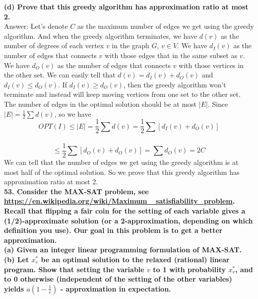 \documentclass{article}
\begin{document}
\textbf{(d) Prove that this greedy algorithm has approximation ratio at most 2.} \\ \newline
Answer: Let's denote $C$ as the maximum number of edges we get using the greedy algorithm. And when the greedy algorithm terminates, we have $d(v)$ as the number of degrees of each vertex $v$ in the graph $G$, $v\in V$. We have $d_I(v)$ as the number of edges that connects $v$ with those edges that in the same subset as $v$. We have $d_O(v)$ as the number of edges that connects $v$ with those vertices in the other set. We can easily tell that $d(v) = d_I(v) + d_O(v)$ and $d_I(v) \leq d_O(v)$. If $d_I(v) \geq d_O(v)$, then the greedy algorithm won't terminate and instead will keep moving vertices from one set to the other set. The number of edges in the optimal solution should be at most $|E|$. Since $|E| = \frac{1}{2}\sum d(v)$, so we have 
$$OPT(I) \leq |E| = \frac{1}{2}\sum d(v) = \frac{1}{2}\sum [d_I(v) + d_O(v)]$$\\
$$\leq \frac{1}{2}\sum [d_O(v) + d_O(v)] = \sum d_O(v) = 2C$$
We can tell that the number of edges we get using the greedy algorithm is at most half of the optimal solution. So we prove that this greedy algorithm has approximation ratio at most 2. \\ \newline
\textbf{53. Consider the MAX-SAT problem, see \url{https://en.wikipedia.org/wiki/Maximum_ satisfiability_problem}. Recall that flipping a fair coin for the setting of each variable gives a (1/2)-approximate solution (or a 2-approximation, depending on which definition you use). Our goal in this problem is to get a better approximation.} \\ \newline
\textbf{(a) Given an integer linear programming formulation of MAX-SAT.} \\ \newline
\textbf{(b) Let $x_v^*$ be an optimal solution to the relaxed (rational) linear program. Show that setting the variable $v$ to 1 with probability $x_v^*$, and to 0 otherwise (independent of the setting of the other variables) yields $a(1 - \frac{1}{e})$ - approximation in expectation. }
\end{document}
